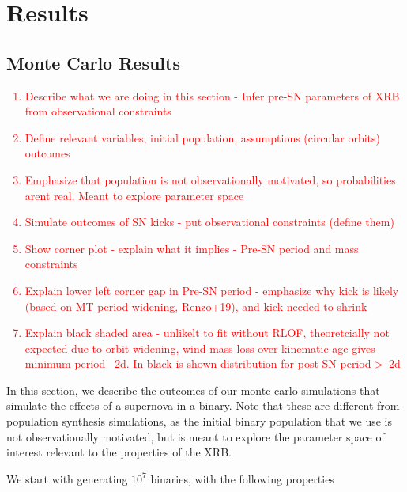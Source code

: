 \documentclass[linenumbers,trackchanges,twocolumn]{aastex701}
\newcommand{\red}{\textcolor{red}}
\begin{document}
\section{Results}

\subsection{Monte Carlo Results}

\red{
\begin{enumerate}
    \item Describe what we are doing in this section - Infer pre-SN parameters of XRB from observational constraints
    \item Define relevant variables, initial population, assumptions (circular orbits) outcomes
    \item Emphasize that population is not observationally motivated, so probabilities arent real. Meant to explore parameter space
    \item Simulate outcomes of SN kicks - put observational constraints (define them)
    \item Show corner plot - explain what it implies - Pre-SN period and mass constraints
    \item Explain lower left corner gap in Pre-SN period - emphasize why kick is likely (based on MT period widening, Renzo+19), and kick needed to shrink
    \item Explain black shaded area - unlikelt to fit without RLOF, theoretcially not expected due to orbit widening, wind mass loss over kinematic age gives minimum period ~2d. In black is shown distribution for post-SN period >~2d
\end{enumerate}
}

In this section, we describe the outcomes of our monte carlo simulations that simulate the effects of a supernova in a binary. Note that these are different from population synthesis simulations, as the initial binary population that we use is not observationally motivated, but is meant to explore the parameter space of interest relevant to the properties of the XRB. 

We start with generating $10^7$ binaries, with the following properties
 
\end{document}
